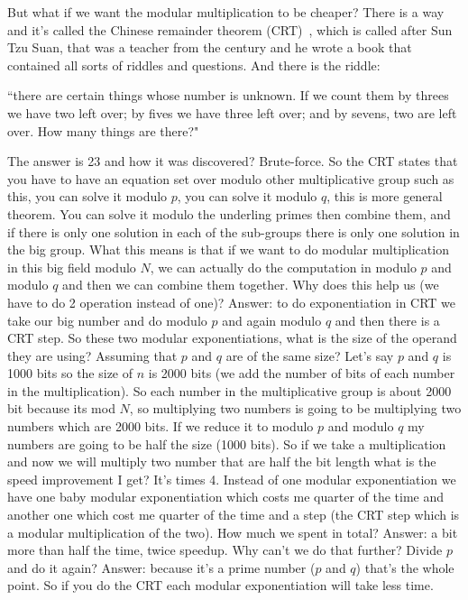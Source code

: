 But what if we want the modular multiplication to be cheaper? There is a way and
it's called the Chinese remainder theorem (CRT)~\cite{dingyi1996chinese}, which
is called after Sun Tzu Suan, that was a teacher from the  century and he
wrote a book that contained all sorts of riddles and questions. And there is the
riddle: 

``there are certain things whose number is unknown.  If we count them by threes
we have two left over; by fives we have three left over; and by sevens, two are
left over. How many things are there?" 

The answer is 23 and how it was discovered? Brute-force. So the CRT states that
you have to have an equation set over modulo other multiplicative group such as
this, you can solve it modulo $p$, you can solve it modulo $q$, this is more
general theorem. You can solve it modulo the underling primes then combine them,
and if there is only one solution in each of the sub-groups there is only one
solution in the big group. What this means is that if we want to do modular
multiplication in this big field modulo $N$, we can actually do the computation
in modulo $p$ and modulo $q$ and then we can combine them together. Why does
this help us (we have to do 2 operation instead of one)? Answer: to do
exponentiation in CRT we take our  big number and do modulo $p$ and again modulo
$q$ and then there is a CRT step. So these two modular exponentiations, what is
the size of the operand they are using? Assuming that $p$ and $q$ are of the
same size? Let's say $p$ and $q$ is 1000 bits so the size of $n$ is 2000 bits
(we add the number of bits of each number in the multiplication).  So each
number in the multiplicative group is about 2000 bit because its mod $N$, so
multiplying two numbers is going to be multiplying two numbers which are 2000
bits. If we reduce it to modulo $p$ and modulo $q$ my numbers are going to be
half the size (1000 bits). So if we take a multiplication and now we will
multiply two number that are half the bit length what is the speed improvement I
get? It's times 4. Instead of one modular exponentiation we have one baby
modular exponentiation which costs me quarter of the time and another one which
cost me quarter of the time and a step (the CRT step which is a modular
multiplication of the two). How much we spent in total? Answer: a bit more than
half the time, twice speedup. Why can't we do that further? Divide $p$ and do it
again? Answer: because it's a prime number ($p$ and $q$) that's the whole point.
So if you do the CRT each modular exponentiation will take less time. 

